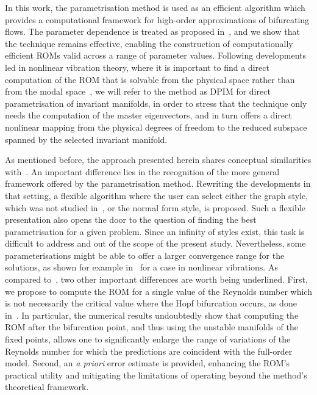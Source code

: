 \documentclass[%
reprint,
superscriptaddress,
 amsmath,amssymb,
 aps,
 pre
]{revtex4-2}
\begin{document}
In this work, the parametrisation method is used as an efficient algorithm which provides a computational framework for high-order approximations of bifurcating flows. The parameter dependence is treated as proposed in~\cite{MingwuLi2024,Stabile:follow}, and we show that the technique remains effective, enabling the construction of computationally efficient ROMs valid across a range of parameter values. Following developments led in nonlinear vibration theory, where it is important to find a direct computation of the ROM that is solvable from the physical space rather than from the modal space~\cite{artDNF2020,JAIN2021How,vizza21high}, we will refer to the method as DPIM for direct parametrisation of invariant manifolds, in order to stress that the technique only needs the computation of the master eigenvectors, and in turn offers a direct nonlinear mapping from the physical degrees of freedom to the reduced subspace spanned by the selected invariant manifold.

As mentioned before, the approach presented herein shares conceptual similarities with~\cite{Carini2015}. An important difference lies in the recognition of the more general framework offered by the parametrisation method. Rewriting the developments in that setting, a flexible algorithm where the user can select either the graph style, which was not studied in~\cite{Carini2015}, or the normal form style, is proposed. Such a flexible presentation also opens the door to the question of finding the best parametrisation for a given problem. Since an infinity of styles exist, this task is difficult to address and out of the scope of the present study. Nevertheless, some parameterisations might be able to offer a larger convergence range for the solutions, as shown for example in~\cite{Stoychev:failing} for a case in nonlinear vibrations.
As compared to~\cite{Carini2015}, two other important differences are worth being underlined. First, we propose to compute the ROM for a single value of the Reynolds number which is not necessarily the critical value where the Hopf bifurcation occurs, as done in~\cite{Carini2015}. In particular, the numerical results undoubtedly show that computing the ROM after the bifurcation point, and thus using the unstable manifolds of the fixed points, allows one to significantly enlarge the range of variations of the Reynolds number for which the predictions are coincident with the full-order model. Second, an \textit{a priori} error estimate is provided, enhancing the ROM's practical utility and mitigating the limitations of operating beyond the method's theoretical framework.
\end{document}
